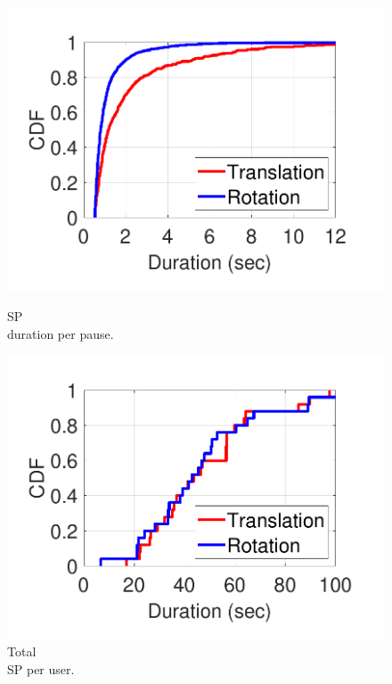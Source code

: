 \begin{figure}[t]
	\centering
	\begin{minipage}{.25\textwidth}
		\centering
		\includegraphics[width=\linewidth]{figs/firefly/per_pause_duration.pdf} \vspace{-.25in}
		\caption{\small SP\\ duration per pause.}
		\label{fig:per_pause_duration}
	\end{minipage}
	\hspace{-.1in}
	\begin{minipage}{.25\textwidth}
		\centering
		\includegraphics[width=\linewidth]{figs/firefly/total_pause.pdf} \vspace{-.25in}
		\caption{\small Total\\ SP per user.}

\end{minipage}
\end{figure}
